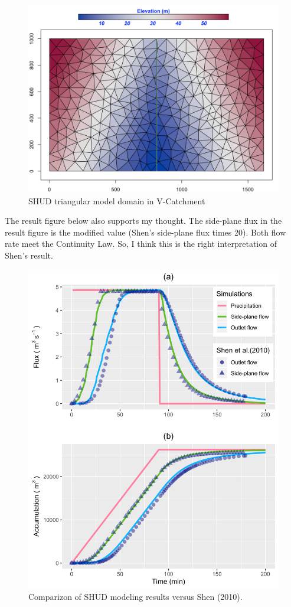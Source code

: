 \documentclass[]{scrbook}
\begin{document}
\begin{figure}
\centering
\includegraphics{Fig/Example/vCat/vc_mesh.png}
\caption{SHUD triangular model domain in V-Catchment}
\end{figure}

The result figure below also supports my thought. The side-plane flux in
the result figure is the modified value (Shen's side-plane flux times
20). Both flow rate meet the Continuity Law. So, I think this is the
right interpretation of Shen's result.

\begin{figure}
\centering
\includegraphics{Fig/Example/vCat/vcat_vs_vs.png}
\caption{Comparizon of SHUD modeling results versus Shen (2010).}
\end{figure}
\end{document}
